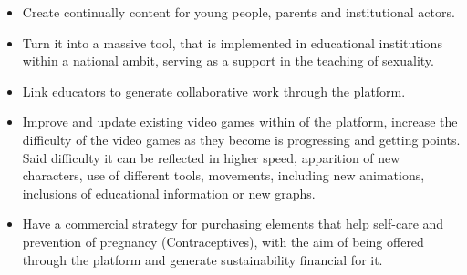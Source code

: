 \documentclass[journal,transmag]{IEEEtran}
\begin{document}
\begin{itemize}
\item Create continually content for young people, parents and institutional actors.
\item Turn it into a massive tool, that is implemented in educational institutions within a national ambit, serving as a support in the teaching of sexuality.
\item Link educators to generate collaborative work through the platform.
\item Improve and update existing video games within of the platform, increase the difficulty of the video games as they become is progressing and getting points. Said difficulty it can be reflected in higher speed, apparition of new characters, use of different tools, movements, including new animations, inclusions of educational information or new graphs.
\item Have a commercial strategy for purchasing elements that help self-care and prevention
of pregnancy (Contraceptives), with the aim of being offered through the platform and generate sustainability financial for it.
\end{itemize}



\end{document}
